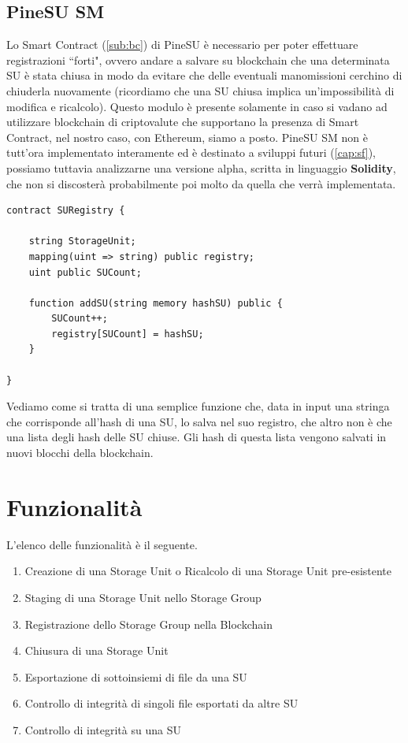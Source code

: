 \newpage

\subsection{PineSU SM}
\label{sub:sm}
Lo Smart Contract (\autoref{sub:bc}) di PineSU è necessario
per poter effettuare registrazioni ``forti", ovvero andare a salvare su blockchain
che una determinata SU è stata chiusa in modo da evitare che delle eventuali manomissioni
cerchino di chiuderla nuovamente (ricordiamo che una SU chiusa implica un'impossibilità di modifica e ricalcolo).
Questo modulo è presente solamente in caso si vadano ad utilizzare blockchain di criptovalute che
supportano la presenza di Smart Contract, nel nostro caso, con Ethereum, siamo a posto.
PineSU SM non è tutt'ora implementato interamente ed è destinato a sviluppi futuri (\autoref{cap:sf}),
possiamo tuttavia analizzarne una versione alpha, scritta in linguaggio \textbf{Solidity}, 
che non si discosterà probabilmente poi molto da quella che verrà implementata.

\vspace{\baselineskip}

\begin{lstlisting}[language=Solidity]
contract SURegistry {

    string StorageUnit;
    mapping(uint => string) public registry;
    uint public SUCount;

    function addSU(string memory hashSU) public {
        SUCount++;
        registry[SUCount] = hashSU;
    }

}
\end{lstlisting}
Vediamo come si tratta di una semplice funzione che, data in input una stringa
che corrisponde all'hash di una SU, lo salva nel suo registro, che altro non è che una
lista degli hash delle SU chiuse. Gli hash di questa lista vengono salvati in nuovi
blocchi della blockchain.

\newpage

\section{Funzionalità}

L'elenco delle funzionalità è il seguente.

\begin{enumerate}
    \item Creazione di una Storage Unit o Ricalcolo di una Storage Unit pre-esistente
    \item Staging di una Storage Unit nello Storage Group
    \item Registrazione dello Storage Group nella Blockchain
    \item Chiusura di una Storage Unit
    \item Esportazione di sottoinsiemi di file da una SU
    \item Controllo di integrità di singoli file esportati da altre SU
    \item Controllo di integrità su una SU
\end{enumerate}

